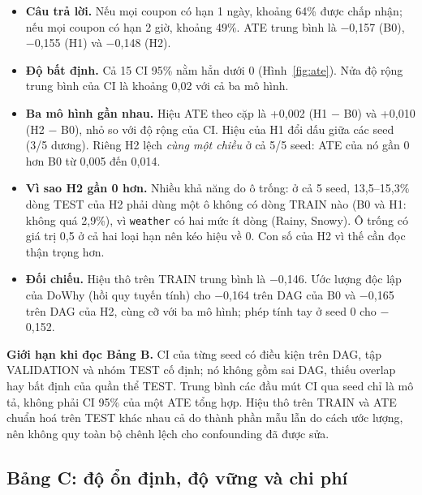 \documentclass[pdflatex,sn-mathphys-num]{sn-jnl}%
\newcommand{\var}[1]{\texttt{#1}}                 %
\begin{document}
\begin{itemize}
\item \textbf{Câu trả lời.} Nếu mọi coupon có hạn 1 ngày, khoảng 64\% được chấp nhận; nếu mọi coupon có hạn 2 giờ, khoảng 49\%. ATE trung bình là $-$0,157 (B0), $-$0,155 (H1) và $-$0,148 (H2).
\item \textbf{Độ bất định.} Cả 15 CI 95\% nằm hẳn dưới 0 (Hình~\ref{fig:ate}). Nửa độ rộng trung bình của CI là khoảng 0,02 với cả ba mô hình.
\item \textbf{Ba mô hình gần nhau.} Hiệu ATE theo cặp là +0,002 (H1 $-$ B0) và +0,010 (H2 $-$ B0), nhỏ so với độ rộng của CI. Hiệu của H1 đổi dấu giữa các seed (3/5 dương). Riêng H2 lệch \emph{cùng một chiều} ở cả 5/5 seed: ATE của nó gần 0 hơn B0 từ 0,005 đến 0,014.
\item \textbf{Vì sao H2 gần 0 hơn.} Nhiều khả năng do ô trống: ở cả 5 seed, 13,5--15,3\% dòng TEST của H2 phải dùng một ô không có dòng TRAIN nào (B0 và H1: không quá 2,9\%), vì \var{weather} có hai mức ít dòng (Rainy, Snowy). Ô trống có giá trị 0,5 ở cả hai loại hạn nên kéo hiệu về 0. Con số của H2 vì thế cần đọc thận trọng hơn.
\item \textbf{Đối chiếu.} Hiệu thô trên TRAIN trung bình là $-$0,146. Ước lượng độc lập của DoWhy (hồi quy tuyến tính) cho $-$0,164 trên DAG của B0 và $-$0,165 trên DAG của H2, cùng cỡ với ba mô hình; phép tính tay ở seed 0 cho $-$0,152.
\end{itemize}

\textbf{Giới hạn khi đọc Bảng B.} CI của từng seed có điều kiện trên DAG, tập VALIDATION và nhóm TEST cố định; nó không gồm sai DAG, thiếu overlap hay bất định của quần thể TEST. Trung bình các đầu mút CI qua seed chỉ là mô tả, không phải CI 95\% của một ATE tổng hợp. Hiệu thô trên TRAIN và ATE chuẩn hoá trên TEST khác nhau cả do thành phần mẫu lẫn do cách ước lượng, nên không quy toàn bộ chênh lệch cho confounding đã được sửa.

\subsection{Bảng C: độ ổn định, độ vững và chi phí}\label{sec:tableC}
\end{document}
